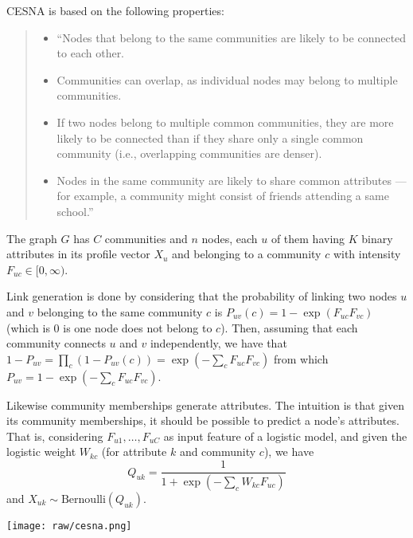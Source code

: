 \begin{itemize}[leftmargin=*]
CESNA is based on the following properties:

\begin{quote}
\begin{itemize}[leftmargin=*,nosep]
\item
  ``Nodes that belong to the same communities are likely to be connected
  to each other.
\item
  Communities can overlap, as individual nodes may belong to multiple
  communities.
\item
  If two nodes belong to multiple common communities, they are more
  likely to be connected than if they share only a single common
  community (i.e., overlapping communities are denser).
\item
  Nodes in the same community are likely to share common attributes ---
  for example, a community might consist of friends attending a same
  school.''
\end{itemize}
\end{quote}

The graph $G$ has $C$ communities and $n$ nodes, each $u$ of
them having $K$ binary attributes in its profile vector $X_u$ and
belonging to a community $c$ with intensity
$F_{uc} \in [0, \infty)$.

Link generation is done by considering that the probability of linking
two nodes $u$ and $v$ belonging to the same community $c$ is
$P_{uv}(c) = 1-\exp(F_{uc}F_{vc})$ (which is $0$ is one node does
not belong to $c$). Then, assuming that each community connects $u$
and $v$ independently, we have that
$1-P_{uv} = \prod_c (1-P_{uv}(c)) = \exp(-\sum_c F_{uc}F_{vc})$ from
which $P_{uv} = 1-\exp(-\sum_c F_{uc}F_{vc})$.

\begin{minipage}[t]{0.6\linewidth}
Likewise community memberships generate attributes. The intuition is
that given its community memberships, it should be possible to predict a
node's attributes. That is, considering $F_{u1},\ldots,F_{uC}$ as
input feature of a logistic model, and given the logistic weight
$W_{kc}$ (for attribute $k$ and community $c$), we have
\[Q_{uk} = \frac{1}{1+\exp(-\sum_c W_{kc}F_{uc})}\] and
$X_{uk} \sim \mathrm{Bernoulli}(Q_{uk})$.
\end{minipage}
\begin{minipage}[t]{0.37\linewidth}
  \centering
  \vspace{-\ht\strutbox}
  \texttt{[image: raw/cesna.png]}
\end{minipage}



\end{itemize}
